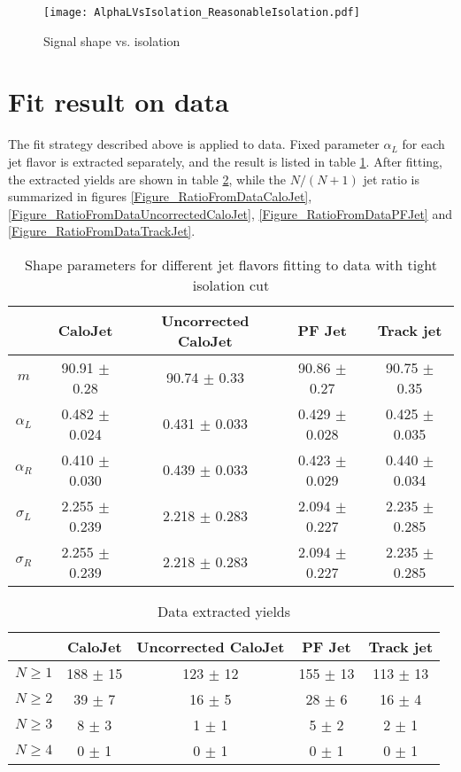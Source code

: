 \documentclass[10pt,a4paper,onecolumn]{article}
\begin{document}
\begin{figure}
\texttt{[image: AlphaLVsIsolation\_ReasonableIsolation.pdf]}
\caption{Signal shape vs. isolation}
\label{Figure_SignalShapeVsIsolation}
\end{figure}

\section{Fit result on data}

The fit strategy described above is applied to data.  Fixed parameter $\alpha_L$ for each jet flavor is extracted separately, and the result is listed in table \ref{Table_DataAlphaL}.
After fitting, the extracted yields are shown in table \ref{Table_DataExtractedYields}, while the $N/(N+1)$ jet ratio is summarized in figures \ref{Figure_RatioFromDataCaloJet},
\ref{Figure_RatioFromDataUncorrectedCaloJet}, \ref{Figure_RatioFromDataPFJet} and \ref{Figure_RatioFromDataTrackJet}.

\begin{table}
\caption{Shape parameters for different jet flavors fitting to data with tight isolation cut}
\centering
   \begin{tabular}{|c|c|c|c|c|}
      \hline
      & CaloJet & Uncorrected CaloJet & PF Jet & Track jet \\\hline
      $m$ & 90.91 $\pm$ 0.28 & 90.74 $\pm$ 0.33 & 90.86 $\pm$ 0.27 & 90.75 $\pm$ 0.35 \\\hline
      $\alpha_L$ & 0.482 $\pm$ 0.024 & 0.431 $\pm$ 0.033 & 0.429 $\pm$ 0.028 & 0.425 $\pm$ 0.035 \\\hline
      $\alpha_R$ & 0.410 $\pm$ 0.030 & 0.439 $\pm$ 0.033 & 0.423 $\pm$ 0.029 & 0.440 $\pm$ 0.034 \\\hline
      $\sigma_L$ & 2.255 $\pm$ 0.239 & 2.218 $\pm$ 0.283 & 2.094 $\pm$ 0.227 & 2.235 $\pm$ 0.285 \\\hline
      $\sigma_R$ & 2.255 $\pm$ 0.239 & 2.218 $\pm$ 0.283 & 2.094 $\pm$ 0.227 & 2.235 $\pm$ 0.285 \\\hline
   \end{tabular}
   \label{Table_DataAlphaL}
\end{table}

\begin{table}
\caption{Data extracted yields}
\centering
   \begin{tabular}{|c|c|c|c|c|}
      \hline
      & CaloJet & Uncorrected CaloJet & PF Jet & Track jet \\\hline
      $N \ge 1$ & 188 $\pm$ 15 & 123 $\pm$ 12 & 155 $\pm$ 13 & 113 $\pm$ 13 \\\hline
      $N \ge 2$ & 39 $\pm$ 7 & 16 $\pm$ 5 & 28 $\pm$ 6 & 16 $\pm$ 4 \\\hline
      $N \ge 3$ & 8 $\pm$ 3 & 1 $\pm$ 1 & 5 $\pm$ 2 & 2 $\pm$ 1 \\\hline
      $N \ge 4$ & 0 $\pm$ 1 & 0 $\pm$ 1 & 0 $\pm$ 1 & 0 $\pm$ 1 \\\hline
   \end{tabular}
   \label{Table_DataExtractedYields}
\end{table}
\end{document}
